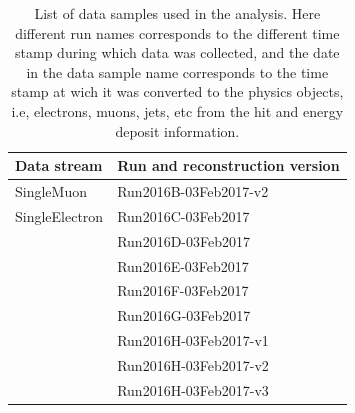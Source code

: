 \begin{table}[!htbp]
  \begin{center}
  \begin{tabular}{l l}
\hline \textbf{Data stream} &  \textbf{Run and reconstruction version}  \\
\hline
SingleMuon      &       Run2016B-03Feb2017-v2       \\
SingleElectron  &       Run2016C-03Feb2017           \\
                &       Run2016D-03Feb2017           \\
		            &       Run2016E-03Feb2017          \\
                &       Run2016F-03Feb2017           \\
		            &       Run2016G-03Feb2017          \\
                &       Run2016H-03Feb2017-v1       \\
		            &       Run2016H-03Feb2017-v2       \\
                &       Run2016H-03Feb2017-v3       \\
\hline
  \end{tabular}
  \caption{List of data samples used in the analysis. Here different run names corresponds to the different time stamp during which data was collected, and the date in the data sample name corresponds to the time stamp at wich it was converted to the physics objects, i.e, electrons, muons, jets, etc from the hit and energy deposit information.}
  \label{tab:datasample}
  \end{center}
\end{table}
 
 
